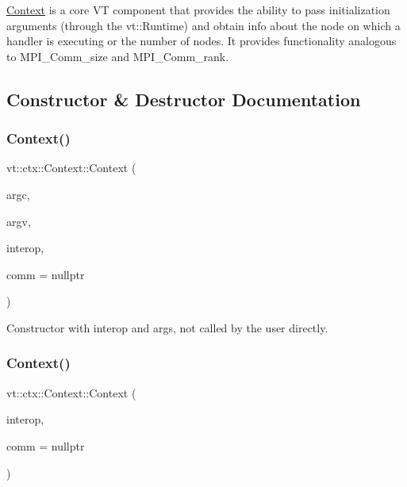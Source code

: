 \hyperlink{structvt_1_1ctx_1_1_context}{Context} is a core VT component that provides the ability to pass initialization arguments (through the {\ttfamily vt\+::\+Runtime}) and obtain info about the node on which a handler is executing or the number of nodes. It provides functionality analogous to {\ttfamily M\+P\+I\+\_\+\+Comm\+\_\+size} and {\ttfamily M\+P\+I\+\_\+\+Comm\+\_\+rank}. 

\subsection{Constructor \& Destructor Documentation}
\mbox{\label{structvt_1_1ctx_1_1_context_a860016b34ca68006a733314f970216b8}} 
\subsubsection{\texorpdfstring{Context()}{Context()}\hspace{0.1cm}{\footnotesize\ttfamily [1/2]}}
{\footnotesize\ttfamily vt\+::ctx\+::\+Context\+::\+Context (\begin{DoxyParamCaption}\item[{int}]{argc,  }\item[{char $\ast$$\ast$}]{argv,  }\item[{bool const}]{interop,  }\item[{M\+P\+I\+\_\+\+Comm $\ast$}]{comm = {\ttfamily nullptr} }\end{DoxyParamCaption})}



Constructor with interop and args, not called by the user directly. 

\mbox{\label{structvt_1_1ctx_1_1_context_a9f5b0fcad61a79f18fdaf7d757b52b6a}} 
\subsubsection{\texorpdfstring{Context()}{Context()}\hspace{0.1cm}{\footnotesize\ttfamily [2/2]}}
{\footnotesize\ttfamily vt\+::ctx\+::\+Context\+::\+Context (\begin{DoxyParamCaption}\item[{bool const}]{interop,  }\item[{M\+P\+I\+\_\+\+Comm $\ast$}]{comm = {\ttfamily nullptr} }\end{DoxyParamCaption})}



